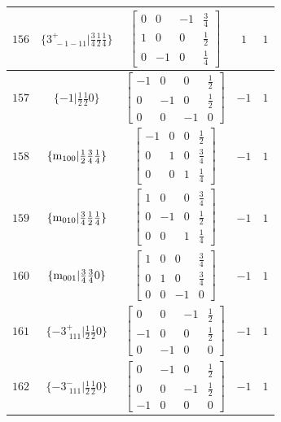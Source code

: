 \documentclass[fleqn,8pt]{jsarticle}
\begin{document}
\begin{longtable}{ccccc}
$ 156 $ & $ \{3^{+}_{\,\,-1-11}|\frac{3}{4} \frac{1}{2} \frac{1}{4}\} $ & $ \begin{bmatrix} 0 & 0 & -1 & \frac{3}{4} \\ 1 & 0 & 0 & \frac{1}{2} \\ 0 & -1 & 0 & \frac{1}{4} \end{bmatrix} $ & $ 1 $ & $ 1 $ \\ \hline
$ 157 $ & $ \{-1|\frac{1}{2} \frac{1}{2} 0\} $ & $ \begin{bmatrix} -1 & 0 & 0 & \frac{1}{2} \\ 0 & -1 & 0 & \frac{1}{2} \\ 0 & 0 & -1 & 0 \end{bmatrix} $ & $ -1 $ & $ 1 $ \\ \hline
$ 158 $ & $ \{{\rm m}_{100}|\frac{1}{2} \frac{3}{4} \frac{1}{4}\} $ & $ \begin{bmatrix} -1 & 0 & 0 & \frac{1}{2} \\ 0 & 1 & 0 & \frac{3}{4} \\ 0 & 0 & 1 & \frac{1}{4} \end{bmatrix} $ & $ -1 $ & $ 1 $ \\ \hline
$ 159 $ & $ \{{\rm m}_{010}|\frac{3}{4} \frac{1}{2} \frac{1}{4}\} $ & $ \begin{bmatrix} 1 & 0 & 0 & \frac{3}{4} \\ 0 & -1 & 0 & \frac{1}{2} \\ 0 & 0 & 1 & \frac{1}{4} \end{bmatrix} $ & $ -1 $ & $ 1 $ \\ \hline
$ 160 $ & $ \{{\rm m}_{001}|\frac{3}{4} \frac{3}{4} 0\} $ & $ \begin{bmatrix} 1 & 0 & 0 & \frac{3}{4} \\ 0 & 1 & 0 & \frac{3}{4} \\ 0 & 0 & -1 & 0 \end{bmatrix} $ & $ -1 $ & $ 1 $ \\ \hline
$ 161 $ & $ \{-3^{+}_{\,\,111}|\frac{1}{2} \frac{1}{2} 0\} $ & $ \begin{bmatrix} 0 & 0 & -1 & \frac{1}{2} \\ -1 & 0 & 0 & \frac{1}{2} \\ 0 & -1 & 0 & 0 \end{bmatrix} $ & $ -1 $ & $ 1 $ \\ \hline
$ 162 $ & $ \{-3^{-}_{\,\,111}|\frac{1}{2} \frac{1}{2} 0\} $ & $ \begin{bmatrix} 0 & -1 & 0 & \frac{1}{2} \\ 0 & 0 & -1 & \frac{1}{2} \\ -1 & 0 & 0 & 0 \end{bmatrix} $ & $ -1 $ & $ 1 $ \\ \hline

\end{longtable}
\end{document}
